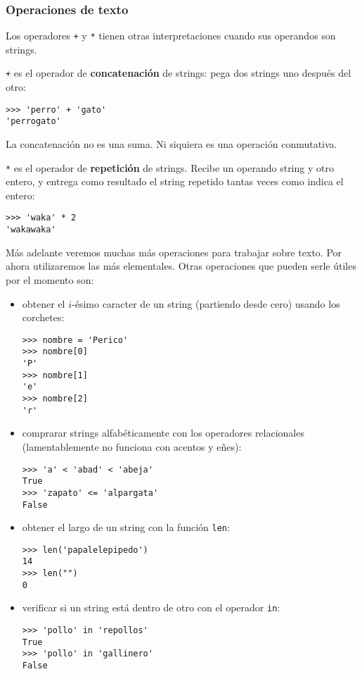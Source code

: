 \subsubsection{Operaciones de texto}

Los operadores \lstinline!+! y \lstinline!*! tienen otras
interpretaciones cuando sus operandos son strings.

\lstinline!+! es el operador de \textbf{concatenación} de strings: pega
dos strings uno después del otro:

\begin{lstlisting}
>>> 'perro' + 'gato'
'perrogato'
\end{lstlisting}

La concatenación no es una suma. Ni siquiera es una operación
conmutativa.

\lstinline!*! es el operador de \textbf{repetición} de strings. Recibe
un operando string y otro entero, y entrega como resultado el string
repetido tantas veces como indica el entero:

\begin{lstlisting}
>>> 'waka' * 2
'wakawaka'
\end{lstlisting}

Más adelante veremos muchas más operaciones para trabajar sobre texto.
Por ahora utilizaremos las más elementales. Otras operaciones que pueden
serle útiles por el momento son:

\begin{itemize}
\item
  obtener el \(i\)-ésimo caracter de un string (partiendo desde cero)
  usando los corchetes:

\begin{lstlisting}
>>> nombre = 'Perico'
>>> nombre[0]
'P'
>>> nombre[1]
'e'
>>> nombre[2]
'r'
\end{lstlisting}
\item
  comprarar strings alfabéticamente con los operadores relacionales
  (lamentablemente no funciona con acentos y eñes):

\begin{lstlisting}
>>> 'a' < 'abad' < 'abeja'
True
>>> 'zapato' <= 'alpargata'
False
\end{lstlisting}
\item
  obtener el largo de un string con la función \lstinline!len!:

\begin{lstlisting}
>>> len('papalelepipedo')
14
>>> len("")
0
\end{lstlisting}
\item
  verificar si un string está dentro de otro con el operador
  \lstinline!in!:

\begin{lstlisting}
>>> 'pollo' in 'repollos'
True
>>> 'pollo' in 'gallinero'
False
\end{lstlisting}
\end{itemize}

